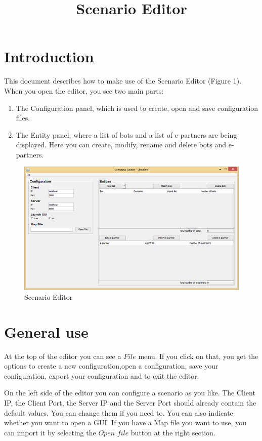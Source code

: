 \documentclass[a4paper]{article}
\title{Scenario Editor}
\date{}
\begin{document}
\maketitle
\newpage

\tableofcontents
\newpage

\section{Introduction}
This document describes how to make use of the Scenario Editor (Figure 1). When you open the editor, you see two main parts:
\begin{enumerate}
\item The Configuration panel, which is used to create, open and save configuration files.
\item The Entity panel, where a list of bots and a list of e-partners are being displayed. Here you can create, modify, rename and delete bots and e-partners.
\end{enumerate}

\begin{figure}[h]
\includegraphics{editor.png}
\caption{Scenario Editor}
\end{figure}

\section{General use}
At the top of the editor you can see a $File$ menu. If you click on that, you get the options to create a new configuration,open a configuration, save your configuration, export your configuration and to exit the editor.

On the left side of the editor you can configure a scenario as you like. The Client IP, the Client Port, the Server IP and the Server Port should already contain the default values. You can change them if you need to. You can also indicate whether you want to open a GUI. If you have a Map file you want to use, you can import it by selecting the $Open$ $file$ button at the right section.
\end{document}
